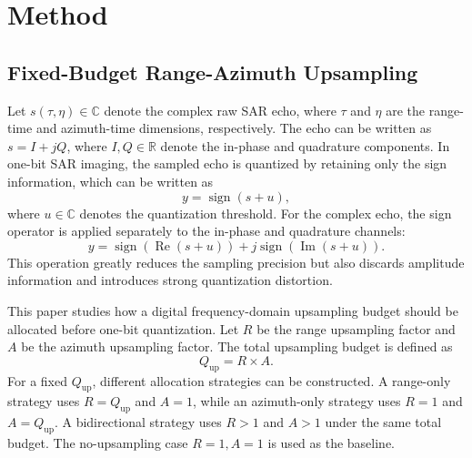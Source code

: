 \documentclass[conference]{IEEEtran}
\begin{document}
\section{Method}

\subsection{Fixed-Budget Range-Azimuth Upsampling}

Let $s(\tau,\eta)\in\mathbb{C}$ denote the complex raw SAR echo, where $\tau$ and $\eta$ are the range-time and azimuth-time dimensions, respectively. The echo can be written as $s=I+jQ$, where $I,Q\in\mathbb{R}$ denote the in-phase and quadrature components. In one-bit SAR imaging, the sampled echo is quantized by retaining only the sign information, which can be written as
\begin{equation}
    y = \operatorname{sign}(s + u),
\end{equation}
where $u\in\mathbb{C}$ denotes the quantization threshold. For the complex echo, the sign operator is applied separately to the in-phase and quadrature channels:
\begin{equation}
    y=\operatorname{sign}(\operatorname{Re}(s+u))
    +j\operatorname{sign}(\operatorname{Im}(s+u)).
\end{equation}
This operation greatly reduces the sampling precision but also discards amplitude information and introduces strong quantization distortion.

This paper studies how a digital frequency-domain upsampling budget should be allocated before one-bit quantization. Let $R$ be the range upsampling factor and $A$ be the azimuth upsampling factor. The total upsampling budget is defined as
\begin{equation}
    Q_{\mathrm{up}} = R \times A .
\end{equation}
For a fixed $Q_{\mathrm{up}}$, different allocation strategies can be constructed. A range-only strategy uses $R=Q_{\mathrm{up}}$ and $A=1$, while an azimuth-only strategy uses $R=1$ and $A=Q_{\mathrm{up}}$. A bidirectional strategy uses $R>1$ and $A>1$ under the same total budget. The no-upsampling case $R=1,A=1$ is used as the baseline.
\end{document}
